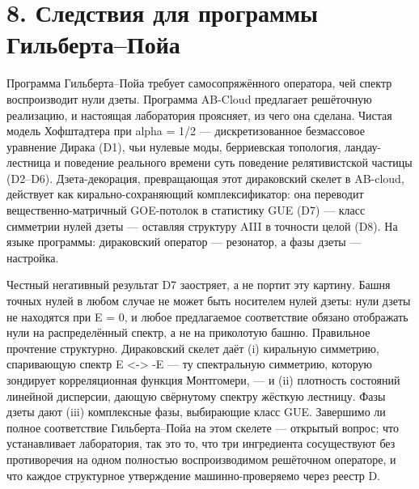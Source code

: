 \documentclass[11pt,a4paper]{article}
\begin{document}
\section{8. Следствия для программы Гильберта--Пойа}
Программа Гильберта--Пойа требует самосопряжённого оператора, чей спектр воспроизводит нули дзеты. Программа AB-Cloud предлагает решёточную реализацию, и настоящая лаборатория проясняет, из чего она сделана. Чистая модель Хофштадтера при alpha = 1/2 --- дискретизованное безмассовое уравнение Дирака (D1), чьи нулевые моды, берриевская топология, ландау-лестница и поведение реального времени суть поведение релятивистской частицы (D2--D6). Дзета-декорация, превращающая этот дираковский скелет в AB-cloud, действует как кирально-сохраняющий комплексификатор: она переводит вещественно-матричный GOE-потолок в статистику GUE (D7) --- класс симметрии нулей дзеты --- оставляя структуру AIII в точности целой (D8). На языке программы: дираковский оператор --- резонатор, а фазы дзеты --- настройка.

Честный негативный результат D7 заостряет, а не портит эту картину. Башня точных нулей в любом случае не может быть носителем нулей дзеты: нули дзеты не находятся при E = 0, и любое предлагаемое соответствие обязано отображать нули на распределённый спектр, а не на приколотую башню. Правильное прочтение структурно. Дираковский скелет даёт (i) киральную симметрию, спаривающую спектр E <-> -E --- ту спектральную симметрию, которую зондирует корреляционная функция Монтгомери, --- и (ii) плотность состояний линейной дисперсии, дающую свёрнутому спектру жёсткую лестницу. Фазы дзеты дают (iii) комплексные фазы, выбирающие класс GUE. Завершимо ли полное соответствие Гильберта--Пойа на этом скелете --- открытый вопрос; что устанавливает лаборатория, так это то, что три ингредиента сосуществуют без противоречия на одном полностью воспроизводимом решёточном операторе, и что каждое структурное утверждение машинно-проверяемо через реестр D.
\end{document}
